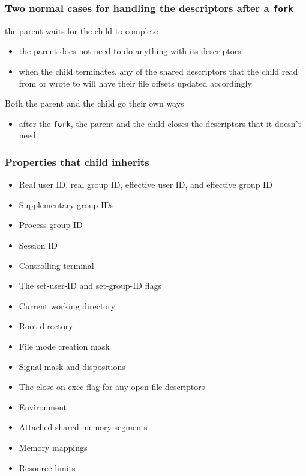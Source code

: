 \documentclass[newPxFont,sthlmFooter,nooffset]{beamer}
\begin{document}
\begin{frame}[t]
  \frametitle{Two normal cases for handling the descriptors after a
    \texttt{fork}}

the parent waits for the child to complete
\begin{itemize}
\item the parent does not need to do anything with its descriptors
\item when the child terminates, any of the shared descriptors that the child read from or wrote to will have their file offsets updated accordingly
\end{itemize}

Both the parent and the child go their own ways
\begin{itemize}
\item after the \texttt{fork}, the parent and the child closes the descriptors that it doesn't need
\end{itemize}
\end{frame}


\begin{frame}
  \frametitle{Properties that child inherits}
  \begin{itemize}
  \item  Real user ID, real group ID, effective user ID, and effective group ID
  \item  Supplementary group IDs
  \item  Process group ID
  \item  Session ID
  \item  Controlling terminal
  \item  The set-user-ID and set-group-ID flags
  \item  Current working directory
  \item  Root directory
  \item  File mode creation mask
  \item  Signal mask and dispositions
  \item  The close-on-exec flag for any open file descriptors
  \item  Environment
  \item  Attached shared memory segments
  \item  Memory mappings
  \item  Resource limits
  \end{itemize}
\end{frame}
\end{document}
